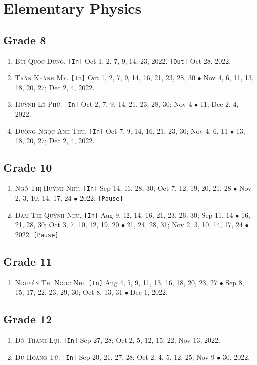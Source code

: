 \documentclass{article}
\numberwithin{equation}{section}
\begin{document}
\section{Elementary Physics}

\subsection{Grade 8}
\begin{enumerate}
	\item \textsc{Bùi Quốc Dũng.} \texttt{[In]} Oct 1, 2, 7, 9, 14, 23, 2022. \texttt{[Out]} Oct 28, 2022.
	\item \textsc{Trần Khánh My.} \texttt{[In]} Oct 1, 2, 7, 9, 14, 16, 21, 23, 28, 30 $\bullet$ Nov 4, 6, 11, 13, 18, 20, 27; Dec 2, 4, 2022.
	\item \textsc{Huỳnh Lê Phú.} \texttt{[In]} Oct 2, 7, 9, 14, 21, 23, 28, 30; Nov 4 $\bullet$ 11; Dec 2, 4, 2022.
	\item \textsc{Đường Ngọc Anh Thư.} \texttt{[In]} Oct 7, 9, 14, 16, 21, 23, 30; Nov 4, 6, 11 $\bullet$ 13, 18, 20, 27; Dec 2, 4, 2022.
\end{enumerate}

\subsection{Grade 10}
\begin{enumerate}
	\item \textsc{Ngô Thị Huỳnh Như.} \texttt{[In]} Sep 14, 16, 28, 30; Oct 7, 12, 19, 20, 21, 28 $\bullet$ Nov 2, 3, 10, 14, 17, 24 $\bullet$ 2022. \texttt{[Pause]}
	\item \textsc{Đàm Thị Quỳnh Như.} \texttt{[In]} Aug 9, 12, 14, 16, 21, 23, 26, 30; Sep 11, 14 $\bullet$ 16, 21, 28, 30; Oct 3, 7, 10, 12, 19, 20 $\bullet$ 21, 24, 28, 31; Nov 2, 3, 10, 14, 17, 24 $\bullet$ 2022. \texttt{[Pause]}
\end{enumerate}

\subsection{Grade 11}
\begin{enumerate}
	\item \textsc{Nguyễn Thị Ngọc Nhi.} \texttt{[In]} Aug 4, 6, 9, 11, 13, 16, 18, 20, 23, 27 $\bullet$ Sep 8, 15, 17, 22, 23, 29, 30; Oct 8, 13, 31 $\bullet$ Dec 1, 2022.
\end{enumerate}

\subsection{Grade 12}
\begin{enumerate}
	\item \textsc{Đỗ Thành Lợi.} \texttt{[In]} Sep 27, 28; Oct 2, 5, 12, 15, 22; Nov 13, 2022.
	\item \textsc{Du Hoàng Tú.} \texttt{[In]} Sep 20, 21, 27, 28; Oct 2, 4, 5, 12, 25; Nov 9 $\bullet$ 30, 2022.
\end{enumerate}
\end{document}
